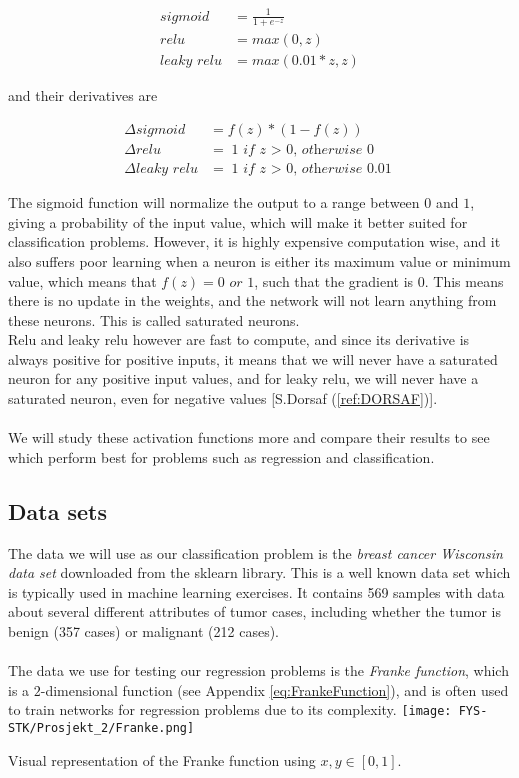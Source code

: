 \documentclass[english,notitlepage,reprint,nofootinbib]{revtex4-1}  %
\begin{document}
\begin{align*}
\textit{sigmoid} &= \frac{1}{1 + e^{-z}} \\
\textit{relu} &= max(0,z) \\ 
\textit{leaky relu} &= max(0.01*z, z)
\end{align*}

and their derivatives are

\begin{align*}
\Delta \textit{sigmoid} &= f(z) * (1-f(z)) \\
\Delta \textit{relu} &= \textit{1 if z $>$ 0, otherwise 0} \\ 
\Delta \textit{leaky relu} &= \textit{1 if z $>$ 0, otherwise 0.01}
\end{align*}

The sigmoid function will normalize the output to a range between $0$ and $1$, giving a probability of the input value, which will make it better suited for classification problems. However, it is highly expensive computation wise, and it also suffers poor learning when a neuron is either its maximum value or minimum value, which means that $f(z) = \textit{0 or 1}$, such that the gradient is $0$. This means there is no update in the weights, and the network will not learn anything from these neurons. This is called saturated neurons.
\\
Relu and leaky relu however are fast to compute, and since its derivative is always positive for positive inputs, it means that we will never have a saturated neuron for any positive input values, and for leaky relu, we will never have a saturated neuron, even for negative values [S.Dorsaf (\ref{ref:DORSAF})].
\\
\\
We will study these activation functions more and compare their results to see which perform best for problems such as regression and classification.


\subsection{Data sets}
The data we will use as our classification problem is the \textit{breast cancer Wisconsin data set} downloaded from the sklearn library. %
This is a well known data set which is typically used in machine learning exercises. %
It contains 569 samples with data about several different attributes of tumor cases, including whether the tumor is benign (357 cases) or malignant (212 cases). 
\\
\\
The data we use for testing our regression problems is the \textit{Franke function}, which is a $2$-dimensional function (see Appendix \ref{eq:FrankeFunction}), and is often used to train networks for regression problems due to its complexity. 
\texttt{[image: FYS-STK/Prosjekt\_2/Franke.png]}
\caption{Visual representation of the Franke function using $x,y \in [0,1]$.}
\end{document}
